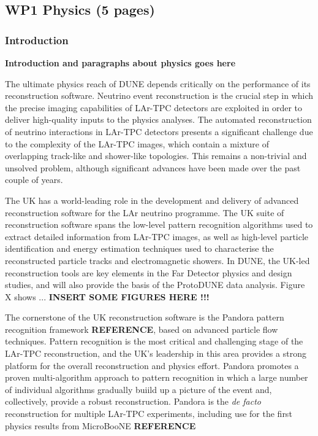 \subsection{WP1 Physics (5 pages)}

\subsubsection{Introduction}


{\bf Introduction and paragraphs about physics goes here}

The ultimate physics reach of DUNE depends critically on the performance of its reconstruction
software. Neutrino event reconstruction is the crucial step in which the precise imaging
capabilities of LAr-TPC detectors are exploited in order to deliver high-quality inputs to
the physics analyses. The automated reconstruction of neutrino interactions in LAr-TPC detectors
presents a significant challenge due to the complexity of the LAr-TPC images, which contain
a mixture of overlapping track-like and shower-like topologies. This remains a non-trivial and
unsolved problem, although significant advances have been made over the past couple of years.

The UK has a world-leading role in the development and delivery of advanced reconstruction
software for the LAr neutrino programme. The UK suite of reconstruction software spans the
low-level pattern recognition algorithms used to extract detailed information from LAr-TPC images,
as well as high-level particle identification and energy estimation techniques used to characterise
the reconstructed particle tracks and electromagnetic showers. In DUNE, the UK-led reconstruction tools
are key elements in the Far Detector physics and design studies, and will also provide the basis of
the ProtoDUNE data analysis. Figure X shows ... {\bf INSERT SOME FIGURES HERE !!!}

The cornerstone of the UK reconstruction software is the Pandora pattern recognition framework {\bf REFERENCE},
based on advanced particle flow techniques. Pattern recognition is the most critical
and challenging stage of the LAr-TPC reconstruction, and the UK's leadership in this area provides
a strong platform for the overall reconstruction and physics effort. Pandora promotes a proven
multi-algorithm approach to pattern recognition in which a large number of individual algorithms
gradually buiild up a picture of the event and, collectively, provide a robust reconstruction.
Pandora is the {\it de facto} reconstruction for multiple LAr-TPC experiments, including use for
the first physics results from MicroBooNE {\bf REFERENCE}


